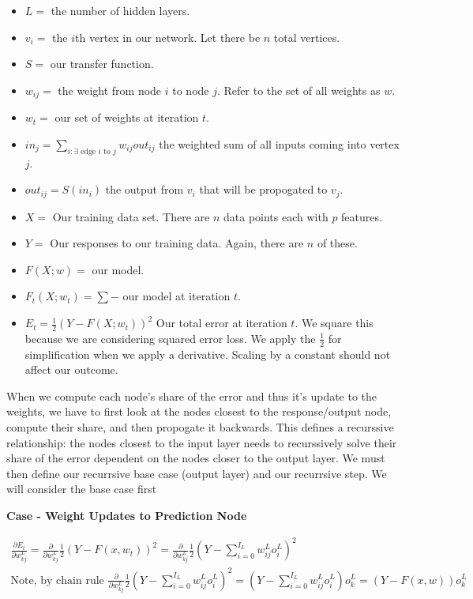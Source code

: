 \documentclass[11pt]{article}
\begin{document}
\begin{itemize}
\item $L = $ the number of hidden layers.
\item $v_{i} = $ the $i$th vertex in our network. Let there be $n$ total 
vertices.
\item $S = $ our transfer function.
\item $w_{ij} = $ the weight from node $i$ to node $j$. Refer to the set of all 
weights as $w$.
\item $w_{t} = $ our set of weights at iteration $t$.
\item $in_{j} = \sum_{i: \exists \text{ edge } i \text{ to } j} w_{ij} out_{ij}$ 
the weighted sum of all inputs coming into vertex $j$.
\item $out_{ij} = S(in_{i})$ the output from $v_{i}$ that will be propogated 
to $v_{j}$.
\item $X = $ Our training data set. There are $n$ data points each with $p$ 
features.
\item $Y = $ Our responses to our training data. Again, there are $n$ of these.
\item $F(X; w) = $ our model.
\item $F_{t}(X; w_{t}) = \sum-$ our model at iteration $t$.
\item $E_{t} = \frac{1}{2}(Y - F(X; w_{t}))^{2} $ Our total error at iteration 
$t$. We square this because we are considering squared error loss. We apply the 
$\frac{1}{2}$ for simplification when we apply a derivative. Scaling by a 
constant should not affect our outcome.
\end{itemize}

\vspace{5 mm}
\noindent
When we compute each node's share of the error and thus it's update to the 
weights, we have to first look at the nodes closest to the response/output 
node, compute their share, and then propogate it backwards. This defines a 
recurssive relationship: the nodes closest to the input layer needs to 
recurssively solve their share of the error dependent on the nodes closer to 
the output layer. We must then define our recurrsive base case (output layer) 
and our recurrsive step. We will consider the base case first

\vspace{5 mm}
\noindent
\textbf{Case - Weight Updates to Prediction Node}

\begin{gather*}
\frac{\partial E_{t}}{\partial w_{kj}^{L}} = 
\frac{\partial}{\partial w_{kj}^{L}}
\frac{1}{2}(Y - F(x, w_{t}))^{2} = 
\frac{\partial}{\partial w_{kj}^{L}} 
\frac{1}{2}(Y - \sum_{i = 0}^{I_{L}} w_{ij}^{L} o_{i}^{L})^{2}\\
\text{Note, by chain rule } 
\frac{\partial}{\partial w_{kj}^{L}} 
\frac{1}{2}(Y - \sum_{i = 0}^{I_{L}} w_{ij}^{L} o_{i}^{L})^{2} = 
(Y - \sum_{i = 0}^{I_{L}} w_{ij}^{L} o_{i}^{L}) o_{k}^{L} = 
(Y - F(x, w)) o_{k}^{L}
\end{gather*}
\end{document}
